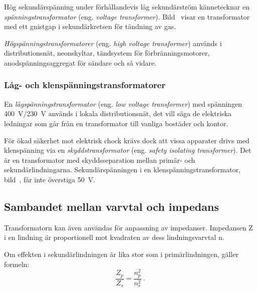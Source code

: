 Hög sekundärspänning under förhållandevis låg sekundärström kännetecknar en
\emph{spänningstransformator} (eng. \emph{voltage transformer}).
Bild~ visar en transformator med ett gnistgap i
sekundärkretsen för tändning av gas.

\emph{Högspänningstransformatorer} (eng. \emph{high voltage transformer})
används i distributionsnät, neonskyltar, tändsystem för förbränningsmotorer,
anodspänningsaggregat för sändare och så vidare.


\subsubsection{Låg- och klenspänningstransformatorer}


En \emph{lågspänningstransformator} (eng. \emph{low voltage transformer}) med
spänningen \qty{400}{\volt}/\qty{230}{\volt} används i lokala distributionsnät, det vill säga
de elektriska ledningar som går från en transformator till vanliga bostäder och
kontor.

För ökad säkerhet mot elektrisk chock krävs dock att vissa apparater drivs med
klenspänning via en \emph{skyddstransformator}
(eng. \emph{safety isolating transformer}).
Det är en transformator med skyddsseparation mellan primär- och
sekundärlindningarna.
Sekundärspänningen i en klenspänningstransformator,
bild~, får inte överstiga \qty{50}{\volt}.

\subsection{Sambandet mellan varvtal och impedans}

Transformatorn kan även användas för anpassning av impedanser.
Impedansen Z i en lindning är proportionell mot kvadraten av dess
lindningsvarvtal n.

Om effekten i sekundärlindningen är lika stor som i primärlindningen, gäller
formeln:
%
\[\dfrac{Z_p}{Z_s} = \dfrac{n_p^2}{n_s^2}~.\]
